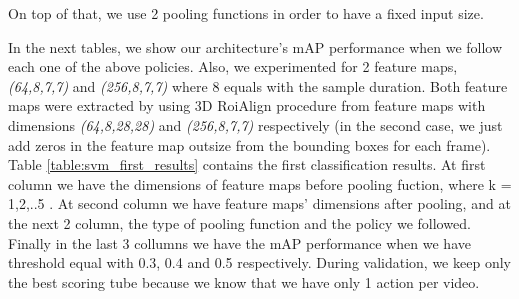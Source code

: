 On top of that, we use 2 pooling functions in order to have a fixed input size. \par
In the next tables, we show our architecture's  mAP performance when we follow each one of the above policies. Also,
we experimented for 2 feature maps, \textit{(64,8,7,7)} and \textit{(256,8,7,7)} where 8 equals with the sample duration.
Both feature maps were extracted by using 3D RoiAlign procedure from feature maps with dimensions \textit{(64,8,28,28)} and
\textit{(256,8,7,7)} respectively (in the second case, we just add zeros in the feature map outsize from the bounding boxes for
each frame). Table \ref{table:svm_first_results} contains the first classification results. At first column we have the dimensions
of feature maps before pooling fuction, where k = 1,2,..5 . At second column we have feature maps' dimensions after pooling, and at
the next 2 column, the type of pooling function and the policy we followed. Finally in the last 3 collumns we have the mAP performance
when we have threshold equal with 0.3, 0.4 and 0.5 respectively. During validation, we keep only the best scoring tube because we know that
we have only 1 action per video.

